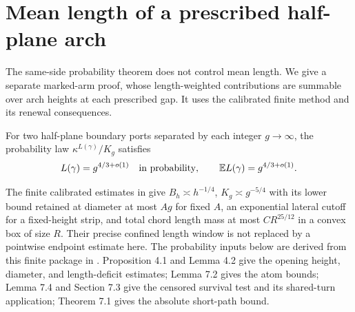 \section{Mean length of a prescribed half-plane arch}\label{c:mean}
The same-side probability theorem does not control mean length.
We give a separate marked-arm proof, whose length-weighted contributions
are summable over arch heights at each prescribed gap.
It uses the calibrated finite method and its renewal consequences.

\begin{theorem}\label{c:arch-mean}
For two half-plane boundary ports separated by each integer $g\to\infty$,
the probability law $\kappa^{L(\gamma)}/K_g$ satisfies
\[
 L(\gamma)=g^{4/3+o(1)}\quad\hbox{in probability},\qquad
 \mathbb E L(\gamma)=g^{4/3+o(1)}.
\]
\end{theorem}
The finite calibrated estimates in \cite[Theorem 1.2 and Proposition 11.1]{Calibrated} give
$B_h\asymp h^{-1/4}$, $K_g\asymp g^{-5/4}$ with its lower bound
retained at diameter at most $Ag$ for fixed $A$, an exponential lateral
cutoff for a fixed-height strip, and total chord length mass at most
$CR^{25/12}$ in a convex box of size $R$. Their precise confined
length window is not replaced by a pointwise endpoint estimate here.
The probability inputs below are derived from this finite package
in \cite[Proposition 4.1, Lemma 4.2, Lemmas 7.2 and 7.4,
Section 7.3, and Theorem 7.1]{Renewal}.
Proposition 4.1 and Lemma 4.2 give the opening height, diameter,
and length-deficit estimates; Lemma 7.2 gives the atom bounds;
Lemma 7.4 and Section 7.3 give the censored survival test and its
shared-turn application; Theorem 7.1 gives the absolute short-path bound.

